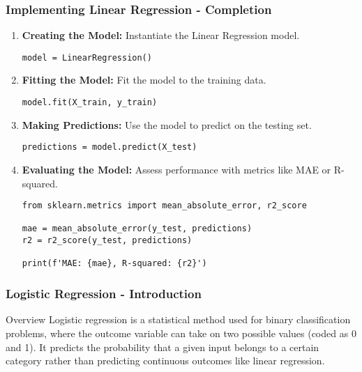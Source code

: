 \documentclass[aspectratio=169]{beamer}
\begin{document}
\begin{frame}[fragile]
    \frametitle{Implementing Linear Regression - Completion}
    \begin{enumerate}[resume]
        \item \textbf{Creating the Model:} Instantiate the Linear Regression model.
        \begin{lstlisting}
model = LinearRegression()
        \end{lstlisting}
        
        \item \textbf{Fitting the Model:} Fit the model to the training data.
        \begin{lstlisting}
model.fit(X_train, y_train)
        \end{lstlisting}
        
        \item \textbf{Making Predictions:} Use the model to predict on the testing set.
        \begin{lstlisting}
predictions = model.predict(X_test)
        \end{lstlisting}
       
        \item \textbf{Evaluating the Model:} Assess performance with metrics like MAE or R-squared.
        \begin{lstlisting}
from sklearn.metrics import mean_absolute_error, r2_score

mae = mean_absolute_error(y_test, predictions)
r2 = r2_score(y_test, predictions)

print(f'MAE: {mae}, R-squared: {r2}')
        \end{lstlisting}
    \end{enumerate}
\end{frame}

\begin{frame}[fragile]
    \frametitle{Logistic Regression - Introduction}
    \begin{block}{Overview}
        Logistic regression is a statistical method used for binary classification problems, where the outcome variable can take on two possible values (coded as 0 and 1). It predicts the probability that a given input belongs to a certain category rather than predicting continuous outcomes like linear regression.
    \end{block}
\end{frame}
\end{document}

